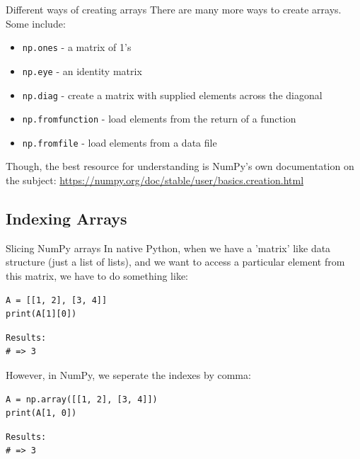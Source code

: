 \documentclass[10pt]{beamer}
\begin{document}
\begin{frame}[label={sec:orgd0adc44},fragile]{Different ways of creating arrays}
 There are many more ways to create arrays. Some include:

\begin{itemize}
\item \texttt{np.ones}  - a matrix of 1's
\item \texttt{np.eye} - an identity matrix
\item \texttt{np.diag} - create a matrix with supplied elements across the diagonal
\item \texttt{np.fromfunction} - load elements from the return of a function
\item \texttt{np.fromfile} - load elements from a data file
\end{itemize}

Though, the best resource for understanding is NumPy's own documentation on the
subject: \url{https://numpy.org/doc/stable/user/basics.creation.html}
\end{frame}

\subsection{Indexing Arrays}
\label{sec:org23a0001}

\begin{frame}[label={sec:org8d004ed},fragile]{Slicing NumPy arrays}
 In native Python, when we have a 'matrix' like data structure (just a list of lists),
and we want to access a particular element from this matrix, we have to do something
like:

\begin{verbatim}
A = [[1, 2], [3, 4]]
print(A[1][0])
\end{verbatim}

\begin{verbatim}
Results: 
# => 3
\end{verbatim}


However, in NumPy, we seperate the indexes by comma:

\begin{verbatim}
A = np.array([[1, 2], [3, 4]])
print(A[1, 0])
\end{verbatim}

\begin{verbatim}
Results: 
# => 3
\end{verbatim}
\end{frame}
\end{document}
